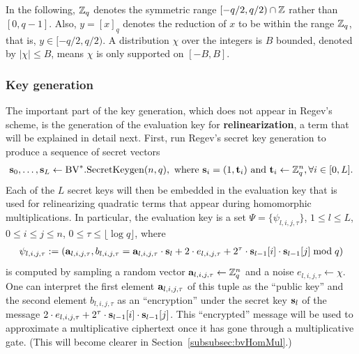 \documentclass[../main.tex]{subfiles}
\begin{document}
In the following, $\mathbb{Z}_q$ denotes the symmetric range $[-q/2, q/2) \cap \mathbb{Z}$ rather than $[0,q-1]$. Also, $y=[x]_q$ denotes the reduction of $x$ to be within the range $\mathbb{Z}_q$, that is, $y \in [-q/2, q/2)$. 
A distribution $\chi$ over the integers is $B$ bounded, denoted by $|\chi| \le B$, means $\chi$ is only supported on $[-B, B]$.


\subsubsection*{Key generation}

The important part of the key generation, which does not appear in Regev's scheme, is the generation of the evaluation key for \textbf{relinearization}, a term that will be explained in detail next. First, run Regev's secret key generation to produce a sequence of secret vectors 
\begin{align*}
    \mathbf{s}_0, \dots, \mathbf{s}_L \leftarrow \text{BV}^*.\text{SecretKeygen}(n,q), \text{ where }
    \mathbf{s}_i = (1, \mathbf{t}_i) 
    \text{ and } \mathbf{t}_i \leftarrow \mathbb{Z}_q^n, \forall i \in [0, L].
\end{align*}
Each of the $L$ secret keys will then be embedded in the evaluation key that is used for relinearizing quadratic terms that appear during homomorphic multiplications. 
In particular, the evaluation key is a set $\Psi=\{\psi_{l,i,j,\tau}\}$, $1 \le l \le L$, $0 \le i \le j \le n$, $0 \le \tau \le \lfloor \log q \rfloor$, where
\begin{align}
    \psi_{l,i,j,\tau} := \left( \vc{a}_{l,i,j,\tau}, b_{l,i,j,\tau}=\vc{a}_{l,i,j,\tau} \cdot \vc{s}_l + 2 \cdot e_{l,i,j,\tau} + 2^{\tau} \cdot \vc{s}_{l-1}[i] \cdot \vc{s}_{l-1}[j] \bmod q \right) %
\end{align}
is computed by sampling a random vector $\mathbf{a}_{l,i,j,\tau} \leftarrow \mathbb{Z}_q^n$ and a noise $e_{l,i,j,\tau} \leftarrow \chi$.
One can interpret the first element $\mathbf{a}_{l,i,j,\tau}$ of this tuple as the ``public key'' and the second element $b_{l,i,j,\tau}$ as an ``encryption'' under the secret key $\mathbf{s}_l$ of the message $2 \cdot e_{l,i,j,\tau} + 2^{\tau} \cdot \mathbf{s}_{l-1}[i] \cdot \mathbf{s}_{l-1}[j]$. This ``encrypted'' message will be used to approximate a multiplicative ciphertext once it has gone through a multiplicative gate. (This will become clearer in Section~\ref{subsubsec:bvHomMul}.)
\end{document}
